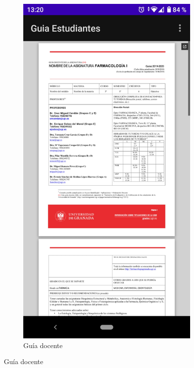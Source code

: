 \begin{figure}[H]
\begin{subfigure}{0.5\textwidth}
  \label{fig:sub-first}
\end{subfigure}
\begin{subfigure}{0.5\textwidth}
  \centering
  \includegraphics[width=1\linewidth]{imagenes/guiadocente.jpeg}
  \caption{Guía docente}
  \label{fig:sub-second}
\end{subfigure}
\end{figure}


